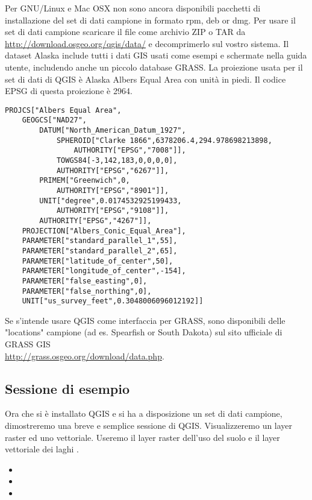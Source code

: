 \nix \osx Per GNU/Linux e Mac OSX non sono ancora disponibili pacchetti
di installazione del set di dati campione in formato rpm, deb or dmg.
Per usare il set di dati campione scaricare il file 
come archivio ZIP o TAR da \url{http://download.osgeo.org/qgis/data/}
e decomprimerlo sul vostro sistema. Il dataset Alaska include tutti
i dati GIS usati come esempi e schermate nella guida utente, includendo anche un piccolo database GRASS. La proiezione usata per
il set di dati di QGIS è Alaska Albers Equal Area con unità in piedi.
Il codice EPSG di questa proiezione è 2964.

\begin{verbatim}
PROJCS["Albers Equal Area",
    GEOGCS["NAD27",
        DATUM["North_American_Datum_1927",
            SPHEROID["Clarke 1866",6378206.4,294.978698213898,
                AUTHORITY["EPSG","7008"]],
            TOWGS84[-3,142,183,0,0,0,0],
            AUTHORITY["EPSG","6267"]],
        PRIMEM["Greenwich",0,
            AUTHORITY["EPSG","8901"]],
        UNIT["degree",0.0174532925199433,
            AUTHORITY["EPSG","9108"]],
        AUTHORITY["EPSG","4267"]],
    PROJECTION["Albers_Conic_Equal_Area"],
    PARAMETER["standard_parallel_1",55],
    PARAMETER["standard_parallel_2",65],
    PARAMETER["latitude_of_center",50],
    PARAMETER["longitude_of_center",-154],
    PARAMETER["false_easting",0],
    PARAMETER["false_northing",0],
    UNIT["us_survey_feet",0.3048006096012192]]
\end{verbatim}

Se s'intende usare QGIS come interfaccia per GRASS, sono disponibili delle "locations" campione
(ad es. Spearfish or South Dakota) sul sito ufficiale
di GRASS GIS  \\
\url{http://grass.osgeo.org/download/data.php}.

\subsection{Sessione di esempio}\label{samplesession}

Ora che si è installato QGIS e si ha a disposizione un set di dati
campione, dimostreremo una breve e semplice sessione di QGIS. Visualizzeremo
un layer raster ed uno vettoriale. Useremo il layer raster dell'uso
del suolo  e
il layer vettoriale dei laghi .


\begin{itemize}
\item {} 
\item {} 
\item {}
\end{itemize} 

